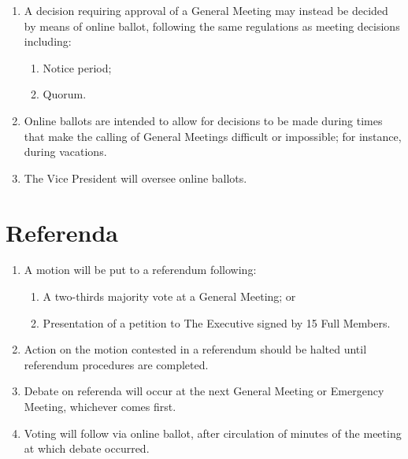 \documentclass[11pt, a4paper]{article}
\begin{document}
\begin{enumerate}
	\item A decision requiring approval of a General Meeting may instead be decided by means of online ballot, following the same regulations as meeting decisions including:
    	\begin{enumerate}
        	\item Notice period;
            \item Quorum.
        \end{enumerate}
    \item Online ballots are intended to allow for decisions to be made during times that make the calling of General Meetings difficult or impossible; for instance, during vacations.
    \item The Vice President will oversee online ballots.
\end{enumerate}





\section{Referenda}
\label{sec:referenda}

\begin{enumerate}
	\item A motion will be put to a referendum following:
    	\begin{enumerate}
        	\item A two-thirds majority vote at a General Meeting; or
            \item Presentation of a petition to The Executive signed by 15 Full Members.
        \end{enumerate}
	\item Action on the motion contested in a referendum should be halted until referendum procedures are completed.
    \item Debate on referenda will occur at the next General Meeting or Emergency Meeting, whichever comes first.
    \item Voting will follow via online ballot, after circulation of minutes of the meeting at which debate occurred.
\end{enumerate}
\end{document}
